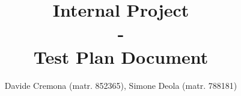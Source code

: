 \documentclass{report}
\begin{document}
\title{\textbf{Internal Project} \\-\\ \textbf{Test Plan Document}}
\author{Davide Cremona (matr. 852365), Simone Deola (matr. 788181)}
 
\maketitle

\tableofcontents












 
\end{document}
